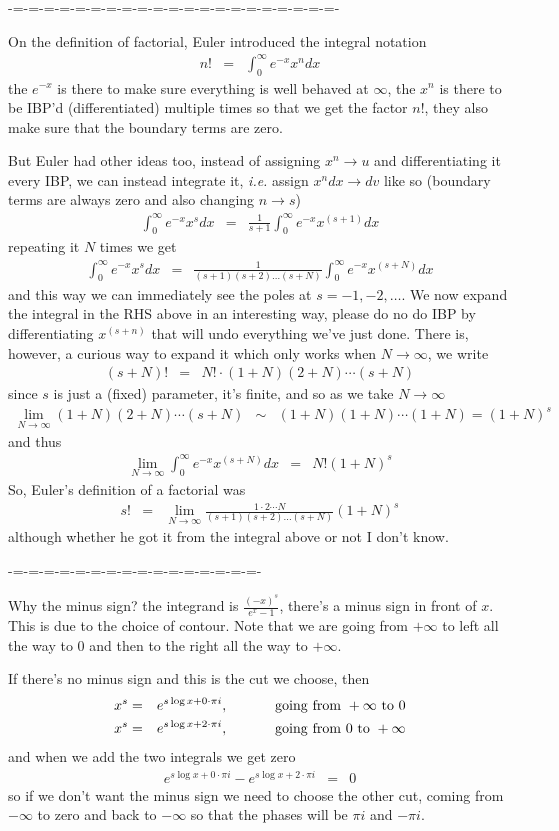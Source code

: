 \documentclass[aps,preprint,preprintnumbers,nofootinbib,showpacs,prd]{revtex4-1}
\newcommand{\ie}{{\it i.e.} }
\newcommand{\nbea}{\begin{eqnarray*}}
\newcommand{\neea}{\end{eqnarray*}}
\begin{document}
-=-=-=-=-=-=-=-=-=-=-=-=-=-=-=-=-=-=-=-=-=-

On the definition of factorial, Euler introduced the integral notation
%
\nbea
n! & = & \int_0^\infty e^{-x} x^n dx
\neea
%
the $e^{-x}$ is there to make sure everything is well behaved at $\infty$, the $x^n$ is there to be IBP'd (differentiated) multiple times so that we get the factor $n!$, they also make sure that the boundary terms are zero.

But Euler had other ideas too, instead of assigning $x^n \to u$ and differentiating it every IBP, we can instead integrate it, \ie assign $x^n dx \to dv$ like so (boundary terms are always zero and also changing $n\to s$)
%
\nbea
\int_0^\infty e^{-x} x^s dx & = & \frac{1}{s+1} \int_0^\infty e^{-x} x^{(s+1)} dx
\neea
%
repeating it $N$ times we get
%
\nbea
\int_0^\infty e^{-x} x^s dx & = & \frac{1}{(s+1)(s+2) \dots (s+N)} \int_0^\infty e^{-x} x^{(s+N)} dx
\neea
%
and this way we can immediately see the poles at $s = -1, -2, \dots$. We now expand the integral in the RHS above in an interesting way, please do no do IBP by differentiating $x^{(s+n)}$ that will undo everything we've just done. There is, however, a curious way to expand it which only works when $N\to\infty$, we write
%
\nbea
(s + N)! & = & N! \cdot (1 + N)(2 + N) \cdots (s+N)
\neea
%
since $s$ is just a (fixed) parameter, it's finite, and so as we take $N\to\infty$
%
\nbea
\lim_{N\to\infty} (1 + N)(2 + N) \cdots (s+N) & \sim & (1 + N)(1 + N) \cdots (1+N) = (1+N)^s
\neea
%
and thus
%
\nbea
\lim_{N\to\infty}\int_0^\infty e^{-x} x^{(s+N)} dx & = & N! (1+N)^s
\neea
%
So, Euler's definition of a factorial was
%
\nbea
s! & = & \lim_{N\to\infty} \frac{1\cdot2\cdots N}{(s+1)(s+2) \dots (s+N)} (1+N)^s
\neea
%
although whether he got it from the integral above or not I don't know.

-=-=-=-=-=-=-=-=-=-=-=-=-=-=-=-=-

Why the minus sign? the integrand is $\frac{(-x)^s}{e^x - 1}$, there's a minus sign in front of $x$. This is due to the choice of contour. Note that we are going from $+\infty$ to left all the way to 0 and then to the right all the way to $+\infty$.

If there's no minus sign and this is the cut we choose, then
%
\nbea
x^s & = & e^{s\log x + 0\cdot\pi i} , ~~~~~~~~~~ {\rm going~from~} +\infty {\rm ~to~} 0 \\
x^s & = & e^{s\log x + 2\cdot\pi i} , ~~~~~~~~~~ {\rm going~from~} 0 {\rm ~to~} +\infty
\neea
% 
and when we add the two integrals we get zero
%
\nbea
e^{s\log x + 0\cdot\pi i} - e^{s\log x + 2\cdot\pi i} & = & 0
\neea
%
so if we don't want the minus sign we need to choose the other cut, coming from $-\infty$ to zero and back to $-\infty$ so that the phases will be $\pi i$ and $-\pi i$.
\end{document}
